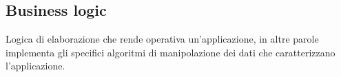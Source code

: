 



\subsection*{Business logic}
Logica di elaborazione che rende operativa un'applicazione, in altre parole implementa gli specifici algoritmi di manipolazione dei dati che caratterizzano l’applicazione.
\clearpage
